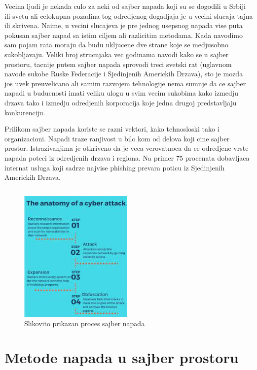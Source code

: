 \documentclass[a4paper]{article}
\begin{document}
{Vecina ljudi je nekada culo za neki od sajber napada koji su se dogodili u Srbiji ili svetu ali celokupna pozadina tog odredjenog dogadjaja je u vecini slucaja tajna ili skrivena. Naime, u vecini slucajeva je pre jednog usepsnog napada vise puta pokusan sajber napad sa istim ciljem ali razlicitim metodama. Kada navodimo sam pojam rata moraju da budu ukljucene dve strane koje se medjusobno sukobljavaju. Veliki broj strucnjaka vec godinama navodi kako se u sajber prostoru, tacnije putem sajber napada sprovodi treci svetski rat (uglavnom navode sukobe Ruske Federacije i Sjedinjenih Americkih Drzava), sto je mozda jos uvek preuvelicano ali samim razvojem tehnologije nema sumnje da ce sajber napadi u buducnosti imati veliku ulogu u svim vecim sukobima kako izmedju drzava tako i izmedju odredjenih korporacija koje jedna drugoj predstavljaju konkurenciju.

Prilikom sajber napada koriste se razni vektori, kako tehnosloski tako i organizacioni. Napadi traze ranjivost u bilo kom od delova koji cine sajber prostor. Istrazivanjima je otkriveno da je veca verovatnoca da ce odredjene vrste napada poteci iz odredjenih drzava i regiona. Na primer 75 procenata dobavljaca internat usluga koji sadrze najvise phishing prevara poticu iz Sjedinjenih Americkih Drzava.

\begin{verbatim}
\end{verbatim}

\begin{figure}[h!]
  \centering
  \begin{center}
  \includegraphics[width=55mm]{index.jpeg}
  \end{center}
  \caption{Slikovito prikazan proces sajber napada}
  \label{fig:vr1}
\end{figure}

\newpage

\section{Metode napada u sajber prostoru}
\label{sec:naslov2}

}
\end{document}
